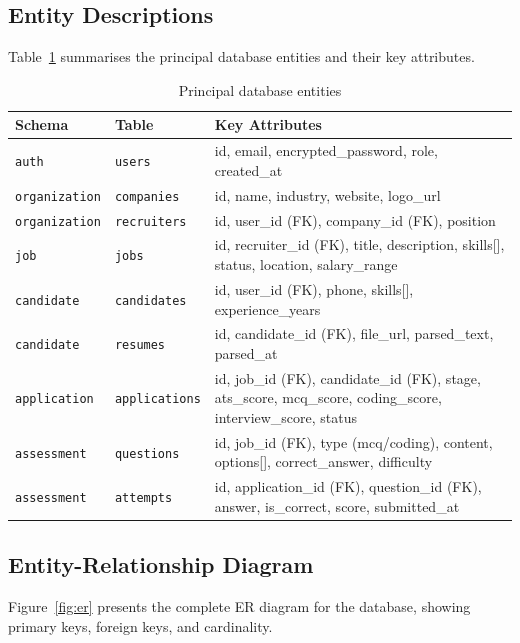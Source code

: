 \subsection{Entity Descriptions}

Table~\ref{tab:entities} summarises the principal database entities and their key attributes.

\begin{table}[htbp]
\centering
\caption{Principal database entities}
\label{tab:entities}
\small
\begin{tabular}{p{1.2in}p{1in}p{3.3in}}
\toprule
\textbf{Schema} & \textbf{Table} & \textbf{Key Attributes} \\
\midrule
\texttt{auth}        & \texttt{users}        & id, email, encrypted\_password, role, created\_at \\
\texttt{organization}& \texttt{companies}    & id, name, industry, website, logo\_url \\
\texttt{organization}& \texttt{recruiters}   & id, user\_id (FK), company\_id (FK), position \\
\texttt{job}         & \texttt{jobs}         & id, recruiter\_id (FK), title, description, skills[], status, location, salary\_range \\
\texttt{candidate}   & \texttt{candidates}   & id, user\_id (FK), phone, skills[], experience\_years \\
\texttt{candidate}   & \texttt{resumes}      & id, candidate\_id (FK), file\_url, parsed\_text, parsed\_at \\
\texttt{application} & \texttt{applications} & id, job\_id (FK), candidate\_id (FK), stage, ats\_score, mcq\_score, coding\_score, interview\_score, status \\
\texttt{assessment}  & \texttt{questions}    & id, job\_id (FK), type (mcq/coding), content, options[], correct\_answer, difficulty \\
\texttt{assessment}  & \texttt{attempts}     & id, application\_id (FK), question\_id (FK), answer, is\_correct, score, submitted\_at \\
\bottomrule
\end{tabular}
\end{table}

\subsection{Entity-Relationship Diagram}

Figure~\ref{fig:er} presents the complete ER diagram for the database, showing primary keys, foreign keys, and cardinality.

